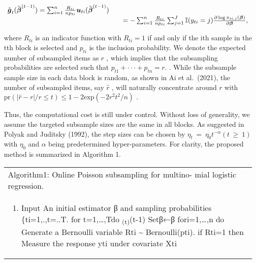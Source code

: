 \documentclass[
  10
]{article}
\providecommand{\tightlist}{%
  \setlength{\itemsep}{0pt}\setlength{\parskip}{0pt}}
\begin{document}
\[
\begin{array} { r l r } {  { \tilde { \boldsymbol g } _ { t } ( \tilde { \boldsymbol \beta } ^ { ( t - 1 ) } ) = \sum _ { i = 1 } ^ { n } \frac { R _ { t i } } { n p _ { t i } } \boldsymbol u _ { t i } ( \tilde { \boldsymbol \beta } ^ { ( t - 1 ) } ) } } \\ & { } & { = - \sum _ { i = 1 } ^ { n } \frac { R _ { t i } } { n p _ { t i } } \sum _ { j = 1 } ^ { J } { \mathbb I } ( y _ { t i } = j ) \frac { \partial \log \pi _ { t i , j } ( { \boldsymbol \beta } ) } { \partial { \boldsymbol \beta } } , } \end{array}
\]

where \(R _ { t i }\) is an indicator function with \(R _ { t i } = 1\)
if and only if the ith sample in the tth block is selected and
\(p _ { t i }\) is the inclusion probability. We denote the expected
number of subsampled items as \(r\) , which implies that the subsampling
probabilities are selected such that
\(p _ { t 1 } + \cdot \cdot \cdot + p _ { t n } = r .\) . While the
subsample sample size in each data block is random, as shown in Ai et
al.~(2021), the number of subsampled items, say \(\hat { r }\) , will
naturally concentrate around \(r\) with
\(\mathrm { p r } ( | \hat { r } - r | / r \le t ) \le 1 - 2 \mathrm { e x p } ( - 2 r ^ { 2 } t ^ { 2 } / n )\)
.

Thus, the computational cost is still under control. Without loss of
generality, we assume the targeted subsample sizes are the same in all
blocks. As suggested in Polyak and Juditsky (1992), the step sizes can
be chosen by
\(\eta _ { t } ~ = ~ \eta _ { 0 } t ^ { - \alpha } ( t ~ \geq ~ 1 )\)
with \(\eta _ { 0 }\) and \(\alpha\) being predetermined
hyper-parameters. For clarity, the proposed method is summarized in
Algorithm 1.

\begin{longtable}[]{@{}
  >{\raggedright\arraybackslash}p{}@{}}
\toprule\noalign{}
\endhead
\bottomrule\noalign{}
\endlastfoot
Algorithm1: Online Poisson subsampling for multino- mial logistic
regression. \\
\begin{minipage}[t]{\linewidth}\raggedright
\begin{enumerate}
\def\labelenumi{\arabic{enumi}.}
\setcounter{enumi}{-1}
\tightlist
\item
  Input An initial estimator β and sampling probabilities
  \{ti=1,.,t=..T. for t=1,\ldots,Tdo \textsubscript{(t)}(t-1) Setβ←β
  fori=1,\ldots,n do Generate a Bernoulli variable Rti \textasciitilde{}
  Bernoulli(pti). if Rti=1 then Measure the response yti under covariate
  Xti
\end{enumerate}
\end{minipage} \\
\end{longtable}
\end{document}
